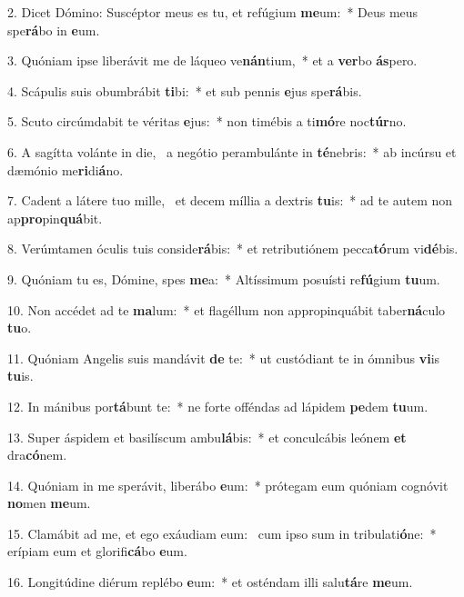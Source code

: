 2. Dicet Dómino: Suscéptor meus es tu, et refúgium \textbf{me}um:~*  Deus meus spe\textbf{rá}bo in \textbf{e}um.\

3. Quóniam ipse liberávit me de láqueo ve\textbf{nán}tium,~*  et a \textbf{ver}bo \textbf{ás}pero.\

4. Scápulis suis obumbrábit \textbf{ti}bi:~*  et sub pennis \textbf{e}jus spe\textbf{rá}bis.\

5. Scuto circúmdabit te véritas \textbf{e}jus:~*  non timébis a ti\textbf{mó}re noc\textbf{túr}no.\

6. A sagítta volánte in die, \dag\  a negótio perambulánte in \textbf{té}nebris:~*  ab incúrsu et dæmónio me\textbf{ri}di\textbf{á}no.\

7. Cadent a látere tuo mille, \dag\  et decem míllia a dextris \textbf{tu}is:~*  ad te autem non ap\textbf{pro}pin\textbf{quá}bit.\

8. Verúmtamen óculis tuis conside\textbf{rá}bis:~*  et retributiónem pecca\textbf{tó}rum vi\textbf{dé}bis.\

9. Quóniam tu es, Dómine, spes \textbf{me}a:~*  Altíssimum posuísti re\textbf{fú}gium \textbf{tu}um.\

10. Non accédet ad te \textbf{ma}lum:~*  et flagéllum non appropinquábit taber\textbf{ná}culo \textbf{tu}o.\

11. Quóniam Angelis suis mandávit \textbf{de} te:~*  ut custódiant te in ómnibus \textbf{vi}is \textbf{tu}is.\

12. In mánibus por\textbf{tá}bunt te:~*  ne forte offéndas ad lápidem \textbf{pe}dem \textbf{tu}um.\

13. Super áspidem et basilíscum ambu\textbf{lá}bis:~*  et conculcábis leónem \textbf{et} dra\textbf{có}nem.\

14. Quóniam in me sperávit, liberábo \textbf{e}um:~*  prótegam eum quóniam cognóvit \textbf{no}men \textbf{me}um.\

15. Clamábit ad me, et ego exáudiam eum: \dag\  cum ipso sum in tribulati\textbf{ó}ne:~*  erípiam eum et glorifi\textbf{cá}bo \textbf{e}um.\

16. Longitúdine diérum replébo \textbf{e}um:~*  et osténdam illi salu\textbf{tá}re \textbf{me}um.\

